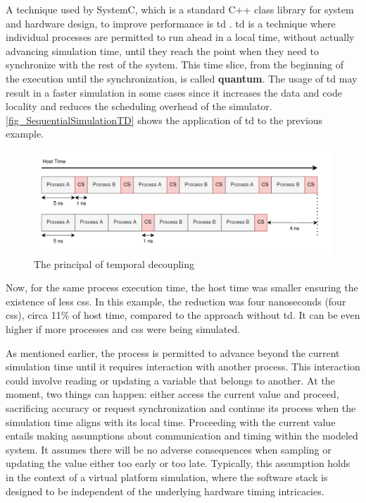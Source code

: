 A technique used by SystemC, which is a standard C++ class
library for system and hardware design, to improve performance is \gls{td} \cite{systemC}. \gls{td} is a technique where individual 
processes are permitted to run ahead in a local time, without actually advancing simulation time, until they reach the point when they need to 
synchronize with the rest of the system. This time slice, from the beginning of the execution until the synchronization, is called 
\textbf{quantum}. The usage of \gls{td} may result in a faster simulation in some cases since it increases the data and code locality and 
reduces the scheduling overhead of the simulator. \autoref{fig_SequentialSimulationTD} shows the application of \gls{td} to the previous example. 

\begin{figure}[H]
	\centering
 	\includegraphics[width=0.8\linewidth]{Images/SequentialSimulationTD.png}
 	\caption{The principal of temporal decoupling}
	 \label{fig_SequentialSimulationTD}
\end{figure}

Now, for the same process execution time, the host time was smaller ensuring the existence of less \glspl{cs}. In this example, the reduction 
was four nanoseconds (four \glspl{cs}), circa 11\% of host time, compared to the approach without \gls{td}. It can be even higher if more 
processes and \glspl{cs} were being simulated.


As mentioned earlier, the process is permitted to advance beyond the current simulation time until it requires interaction with another process. 
This interaction could involve reading or updating a variable that belongs to another. At the moment, two things can happen: either access the 
current value and proceed, sacrificing accuracy or request synchronization and continue its process when the simulation time aligns with its 
local time. Proceeding with the current value entails making assumptions about communication and timing within the modeled system. It assumes 
there will be no adverse consequences when sampling or updating the value either too early or too late. Typically, this assumption holds in 
the context of a virtual platform simulation, where the software stack is designed to be independent of the underlying hardware 
timing intricacies.

